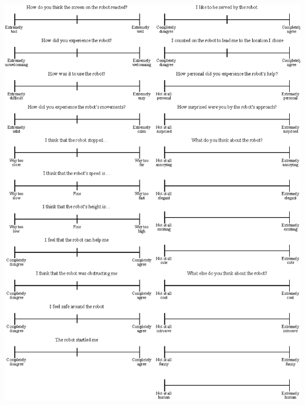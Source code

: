 \documentclass[paperwidth=160cm,paperheight=100cm,landscape,fontscale=0.3010]{baposter}
\begin{document}
\begin{poster}
{\begin{center}
	\includegraphics[width=1.0\linewidth]{AllScales.eps}

\end{center}
}




\end{poster}
\end{document}
